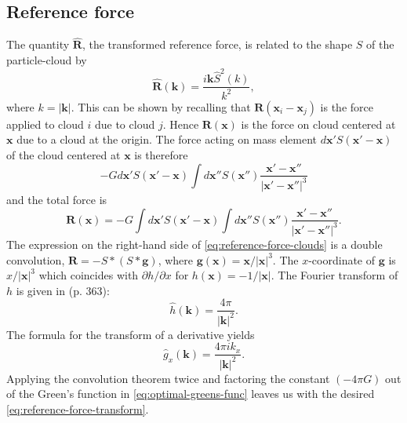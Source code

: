 \subsection{Reference force}
The quantity $\mathbf{\hat{R}}$, the transformed reference force, is related to the shape $S$ of the particle-cloud by
\begin{equation}\label{eq:reference-force-transform}
    \mathbf{\hat{R}}(\mathbf{k}) = \frac{i\mathbf{k}\hat{S}^2(k)}{k^2},
\end{equation}
where $k = |\mathbf{k}|$.
This can be shown by recalling that $\mathbf{R}(\mathbf{x}_i - \mathbf{x}_j)$ is the force applied to cloud $i$ due to cloud $j$.
Hence $\mathbf{R}(\mathbf{x})$ is the force on cloud centered at $\mathbf{x}$ due to a cloud at the origin.
The force acting on mass element $d\mathbf{x}' S(\mathbf{x}' - \mathbf{x})$ of the cloud centered at $\mathbf{x}$ is therefore
\begin{equation*}
    -G d\mathbf{x}'S(\mathbf{x}' - \mathbf{x}) \int d\mathbf{x}'' S(\mathbf{x}'')\frac{\mathbf{x}' - \mathbf{x}''}{|\mathbf{x}' - \mathbf{x}''|^3}
\end{equation*}
and the total force is
\begin{equation}\label{eq:reference-force-clouds}
    \mathbf{R}(\mathbf{x}) = -G \int d\mathbf{x}'S(\mathbf{x}' - \mathbf{x}) \int d\mathbf{x}'' S(\mathbf{x}'')\frac{\mathbf{x}' - \mathbf{x}''}{|\mathbf{x}' - \mathbf{x}''|^3}.
\end{equation}
The expression on the right-hand side of \autoref{eq:reference-force-clouds} is a double convolution, $\mathbf{R} = -S * (S * \mathbf{g})$, where $\mathbf{g}(\mathbf{x}) = \mathbf{x}/|\mathbf{x}|^3.$
The $x$-coordinate of $\mathbf{g}$ is $x/|\mathbf{x}|^3$ which coincides with $\partial h / \partial x$ for $h(\mathbf{x}) = -1/|\mathbf{x}|.$
The Fourier transform of $h$ is given in \cite{gelfand1964generalized} (p. 363):
\begin{equation*}
    \hat{h}(\mathbf{k}) = \frac{4\pi}{|\mathbf{k}|^2}.
\end{equation*}
The formula for the transform of a derivative yields
\begin{equation*}
    \hat{g}_x(\mathbf{k}) = \frac{4\pi i k_x}{|\mathbf{k}|^2}.
\end{equation*}
Applying the convolution theorem twice and factoring the constant $(-4\pi G)$ out of the Green's function in \autoref{eq:optimal-greens-func} leaves us with the desired \autoref{eq:reference-force-transform}.

